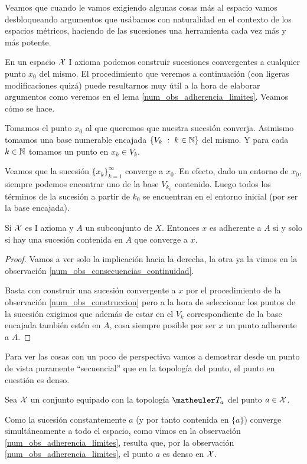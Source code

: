 Veamos que cuando le vamos exigiendo algunas cosas más al espacio vamos desbloqueando argumentos que usábamos con naturalidad en el contexto de los espacios métricos, haciendo de las sucesiones una herramienta cada vez más y más potente.
\begin{obs}
	\label{num_obs_construccion}
	En un espacio $\mathcal{X}$ I axioma podemos construir sucesiones convergentes a cualquier punto $x_0$ del mismo. El procedimiento que veremos a continuación (con ligeras modificaciones quizá) puede resultarnos muy útil a la hora de elaborar argumentos como veremos en el lema \ref{num_obs_adherencia_limites}. Veamos cómo se hace.
	
	Tomamos el punto $x_0$ al que queremos que nuestra sucesión converja. Asimismo tomamos una base numerable encajada $\{V_k\;:\; k\in\mathbb{N}\}$ del mismo. Y para cada $k\in\mathbb{N}$ tomamos un punto en $x_k\in V_k$.
	
	Veamos que la sucesión $\{x_k\}_{k=1}^{\infty}$ converge a $x_0$. En efecto, dado un entorno de $x_0$, siempre podemos encontrar uno de la base $V_{k_0}$ contenido. Luego todos los términos de la sucesión a partir de $k_0$ se encuentran en el entorno inicial (por ser la base encajada).
\end{obs}
\begin{lem}
	\label{num_obs_adherencia_limites}	
	Si $\mathcal{X}$ es I axioma y $A$ un subconjunto de $X$. Entonces $x$ es adherente a $A$ si y solo si hay una sucesión contenida en $A$ que converge a $x$.
\end{lem}
\begin{proof}
	Vamos a ver solo la implicación hacia la derecha, la otra ya la vimos en la observación \ref{num_obs_consecuencias_continuidad}.
	
	Basta con construir una sucesión convergente a $x$ por el procedimiento de la observación \ref{num_obs_construccion} pero a la hora de seleccionar los puntos de la sucesión exigimos que además de estar en el $V_k$ correspondiente de la base encajada también estén en $A$, cosa siempre posible por ser $x$ un punto adherente a $A$.
\end{proof}

Para ver las cosas con un poco de perspectiva vamos a demostrar desde un punto de vista puramente ``secuencial'' que en la topología del punto, el punto en cuestión es denso.
\begin{exa}
	\label{num_exa_adher_topologia_punto}
	Sea $\mathcal{X}$ un conjunto equipado con la topología $\T_a$ del punto $a\in\mathcal{X}$.
	
	Como la sucesión constantemente $a$ (y por tanto contenida en $\{a\}$) converge simultáneamente a todo el espacio, como vimos en la observación \ref{num_obs_adherencia_limites}, resulta que, por la observación \ref{num_obs_adherencia_limites}, el punto $a$ es denso en $\mathcal{X}$.
\end{exa}

